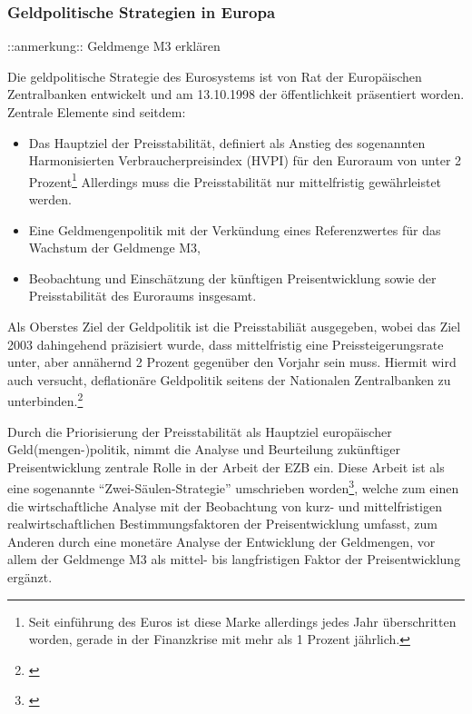 \documentclass[
        onecolumn,
        a4paper,
        abstracton,
        parskip=half
        ,final
        ]{scrartcl}
\begin{document}
\subsubsection{Geldpolitische Strategien in Europa}%
::anmerkung:: Geldmenge M3 erkl{\"a}ren

Die geldpolitische Strategie des Eurosystems ist von Rat der Europ{\"a}ischen Zentralbanken entwickelt und am 13.10.1998 der {\"o}ffentlichkeit pr{\"a}sentiert worden.
Zentrale Elemente sind seitdem:
\begin{itemize}
 \item Das Hauptziel der Preisstabilit{\"a}t, definiert als Anstieg des sogenannten Harmonisierten Verbraucherpreisindex (HVPI) f{\"u}r den Euroraum von unter 2 Prozent\footnote[78]{Seit einf{\"u}hrung des Euros ist diese Marke allerdings jedes Jahr {\"u}berschritten worden, gerade in der Finanzkrise mit mehr als 1 Prozent j{\"a}hrlich.} Allerdings muss die Preisstabilit{\"a}t nur mittelfristig gew{\"a}hrleistet werden.
 \item Eine Geldmengenpolitik mit der Verk{\"u}ndung eines Referenzwertes f{\"u}r das Wachstum der Geldmenge M3,
 \item Beobachtung und Einsch{\"a}tzung der k{\"u}nftigen Preisentwicklung sowie der Preisstabilit{\"a}t des Euroraums insgesamt.
\end{itemize}
Als Oberstes Ziel der Geldpolitik ist die Preisstabili{\"a}t ausgegeben, wobei das Ziel 2003 dahingehend pr{\"a}zisiert wurde, dass mittelfristig eine Preissteigerungsrate unter, aber ann{\"a}hernd 2 Prozent gegen{\"u}ber den Vorjahr sein muss. Hiermit wird auch versucht, deflation{\"a}re Geldpolitik seitens der Nationalen Zentralbanken zu unterbinden.\footnote[101]{\citep[vgl.][S.564-568]{Basseler2010}}

Durch die Priorisierung der Preisstabilit{\"a}t als Hauptziel europ{\"a}ischer Geld(mengen-)politik, nimmt die Analyse und Beurteilung zuk{\"u}nftiger Preisentwicklung zentrale Rolle in der Arbeit der EZB ein. Diese Arbeit ist als eine sogenannte "`Zwei-S{\"a}ulen-Strategie"' umschrieben worden\footnote[95]{\citep[S.568]{Basseler2010}}, welche zum einen die wirtschaftliche Analyse mit der Beobachtung von kurz- und mittelfristigen realwirtschaftlichen Bestimmungsfaktoren der Preisentwicklung umfasst, zum Anderen durch eine monet{\"a}re Analyse der Entwicklung der Geldmengen, vor allem der Geldmenge M3 als mittel- bis langfristigen Faktor der Preisentwicklung erg{\"a}nzt.
\end{document}
